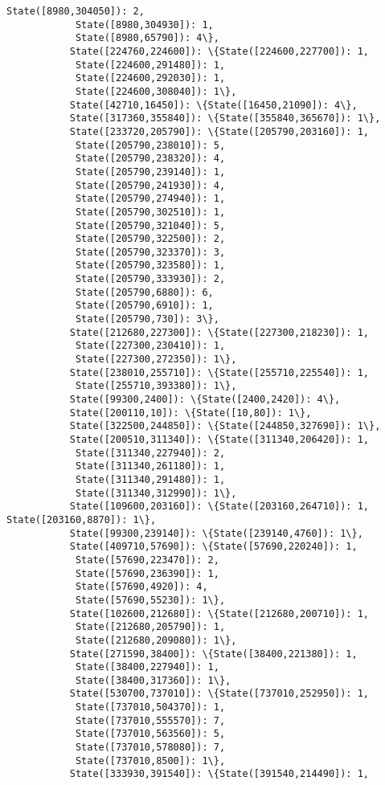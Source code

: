 \documentclass[11pt]{article}
\begin{document}
\begin{Verbatim}[commandchars=\\\{\}]
            State([8980,304050]): 2,
            State([8980,304930]): 1,
            State([8980,65790]): 4\},
           State([224760,224600]): \{State([224600,227700]): 1,
            State([224600,291480]): 1,
            State([224600,292030]): 1,
            State([224600,308040]): 1\},
           State([42710,16450]): \{State([16450,21090]): 4\},
           State([317360,355840]): \{State([355840,365670]): 1\},
           State([233720,205790]): \{State([205790,203160]): 1,
            State([205790,238010]): 5,
            State([205790,238320]): 4,
            State([205790,239140]): 1,
            State([205790,241930]): 4,
            State([205790,274940]): 1,
            State([205790,302510]): 1,
            State([205790,321040]): 5,
            State([205790,322500]): 2,
            State([205790,323370]): 3,
            State([205790,323580]): 1,
            State([205790,333930]): 2,
            State([205790,6880]): 6,
            State([205790,6910]): 1,
            State([205790,730]): 3\},
           State([212680,227300]): \{State([227300,218230]): 1,
            State([227300,230410]): 1,
            State([227300,272350]): 1\},
           State([238010,255710]): \{State([255710,225540]): 1,
            State([255710,393380]): 1\},
           State([99300,2400]): \{State([2400,2420]): 4\},
           State([200110,10]): \{State([10,80]): 1\},
           State([322500,244850]): \{State([244850,327690]): 1\},
           State([200510,311340]): \{State([311340,206420]): 1,
            State([311340,227940]): 2,
            State([311340,261180]): 1,
            State([311340,291480]): 1,
            State([311340,312990]): 1\},
           State([109600,203160]): \{State([203160,264710]): 1, State([203160,8870]): 1\},
           State([99300,239140]): \{State([239140,4760]): 1\},
           State([409710,57690]): \{State([57690,220240]): 1,
            State([57690,223470]): 2,
            State([57690,236390]): 1,
            State([57690,4920]): 4,
            State([57690,55230]): 1\},
           State([102600,212680]): \{State([212680,200710]): 1,
            State([212680,205790]): 1,
            State([212680,209080]): 1\},
           State([271590,38400]): \{State([38400,221380]): 1,
            State([38400,227940]): 1,
            State([38400,317360]): 1\},
           State([530700,737010]): \{State([737010,252950]): 1,
            State([737010,504370]): 1,
            State([737010,555570]): 7,
            State([737010,563560]): 5,
            State([737010,578080]): 7,
            State([737010,8500]): 1\},
           State([333930,391540]): \{State([391540,214490]): 1,

\end{Verbatim}
\end{document}
